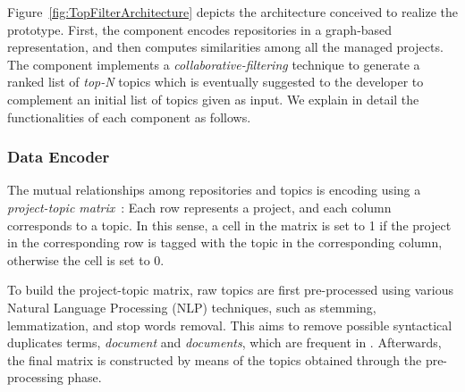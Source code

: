 
Figure~\ref{fig:TopFilterArchitecture} depicts the architecture conceived to realize the \TF prototype. First, %
the  component encodes \GH repositories in a graph-based 
representation, and then  computes similarities 
among all the managed projects. The  component 
implements a \emph{collabora\-tive-filtering} 
technique
to generate a ranked list of \emph{top-N} topics which %
is eventually suggested to the developer to complement an initial list of 
topics given as input. We explain in detail the functionalities of each 
component as follows.


\subsubsection{Data Encoder} \label{sec:DataEncoder}


The mutual relationships among \GH repositories and topics is encoding using a 
\emph{project-topic matrix}~\cite{Sarwar:2001:ICF:371920.372071}: Each row 
represents a project, and each column corresponds to a topic. In this sense, a 
cell in the matrix is set to 1 if the project in the corresponding row is 
tagged with the topic in the corresponding column, otherwise the cell is set to 
0.

To build the project-topic matrix, raw topics are first pre-process\-ed using various Natural Language Processing (NLP) techniques, such as stemming, lemmatization, and stop words removal. This aims to remove possible syntactical duplicates terms, \eg \textit{document} and \textit{documents}, which are frequent in \GH. Afterwards, the final matrix is constructed by means of the topics obtained through the pre-processing phase. %

